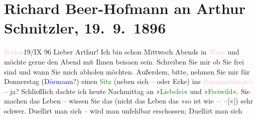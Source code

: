 

               \section[Richard Beer-Hofmann an Arthur Schnitzler, 19. 9. 1896]{ Richard Beer-Hofmann an Arthur Schnitzler, 19. 9. 1896}\nopagebreak{}\rehead{ }\normalsize\beginnumbering{} \toendnotes[C]{\smallbreak\pagebreak[2]} 
\toendnotes[C]{\smallbreak}\pstart
           \centering{}{\pb}\textcolor{pink}{Baden}{}\ledrightnote{\textcolor{pink}{Baden bei Wien}}{ }19/IX 96\pend
           \pstart
           Lieber Arthur! Ich bin schon Mittwoch{ }Abends in \textcolor{pink}{Wien}{}\ledrightnote{\textcolor{pink}{Wien}} und möchte gerne den
                  Abend mit Ihnen beisa{\geminationm}en sein. Schreiben
               Sie mir ob Sie frei sind und wann Sie mich abholen möchten. Außerdem, bitte, nehmen
               Sie mir für Donnerstag (\textcolor{blue}{Dörmann}{}\ledrightnote{\textcolor{blue}{Felix Dörmann}}?)
               einen \textcolor{green}{Sitz}{} (neben sich – oder {\pb}Ecke) ins \textcolor{pink}{Raimundtheater}{}\ledrightnote{\textcolor{pink}{Raimund-Theater}} – ja?\pend
           \pstart
           Schließlich dachte ich heute Nachmittag an »\textcolor{green}{Liebelei}{}\ledrightnote{\textcolor{green}{Liebelei. Schauspiel in drei Akten}}« und »\textcolor{green}{Freiwild}{}\ledrightnote{\textcolor{green}{Freiwild. Schauspiel in 3 Akten}}«. Sie machen das
               Leben – wissen Sie das  (nicht das Leben das »so
               ist {\pb}wie – –{[}«{]})
               sehr schwer. Duellirt man sich – wird man unfehlbar erschossen; Duellirt man sich

